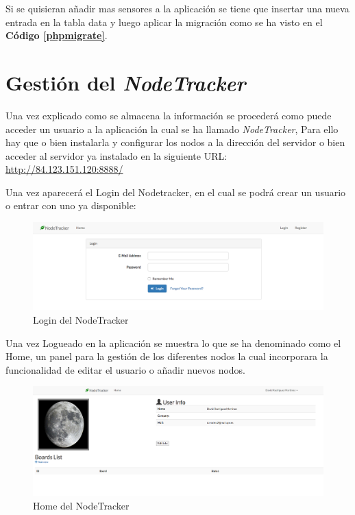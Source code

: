 Si se quisieran añadir mas sensores a la aplicación se tiene que insertar  una nueva entrada en la tabla data y luego aplicar la migración como se ha visto en el  \textbf{Código \ref{phpmigrate}}.

\section{Gestión del \textit{NodeTracker}}


\setlength{\parindent}{5ex}Una vez explicado como se almacena la información se procederá como puede acceder un usuario a la aplicación la cual se ha llamado \textit{NodeTracker}, Para ello hay que o bien instalarla y configurar los nodos a la dirección del servidor o bien acceder al servidor ya instalado en la siguiente URL:
\setlength{\parindent}{0ex}
\\
\url{http://84.123.151.120:8888/}

Una vez aparecerá el Login del Nodetracker, en el cual se podrá crear un usuario o entrar con uno ya disponible:

\begin{figure}[!h]
	\centering
	\includegraphics[width=1.0\linewidth]{figuras/loginnode}
	\caption{Login del NodeTracker}
	\label{fig:loginnode}
\end{figure}

Una vez Logueado en la aplicación se muestra lo que se ha denominado como el Home, un panel para la gestión de los diferentes nodos la cual incorporara la funcionalidad de editar el usuario o añadir nuevos nodos.

\begin{figure}[!h]
	\centering
	\includegraphics[width=1.0\linewidth]{figuras/homenode}
	\caption{Home del NodeTracker}
	\label{fig:homenode}
\end{figure}

